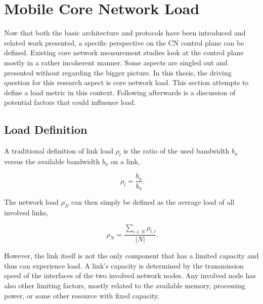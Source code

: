 \section{Mobile Core Network Load}
\label{c4:sec:loaddefinition}

Now that both the basic architecture and protocols have been introduced and related work presented, a specific perspective on the \gls{CN} control plane can be defined. Existing core network measurement studies look at the control plane mostly in a rather incoherent manner. Some aspects are singled out and presented without regarding the bigger picture. In this thesis, the driving question for this research aspect is core network load. This section attempts to define a load metric 
in this context. Following afterwards is a discussion of potential factors that could influence load.


\subsection{Load Definition}

A traditional 
definition of link load $\rho_{l}$ 
is the ratio of the used bandwidth $b_u$ versus the available bandwidth $b_a$ on a link,

\begin{equation}
	\phantom{.}\rho_{l} = \frac{b_{u}}{b_{a}}\text{.}
\end{equation}

The network load $\rho_{N}$ can then simply be defined as the average load of all involved links,

\begin{equation}
	\phantom{.}\rho_{N} = \frac{\sum_{i \in N} \rho_{l,i}}{|N|}\text{.}
\end{equation}


However, the link itself is not the only component that has a limited capacity and thus can experience load. A link's capacity is determined by the transmission speed of the interfaces of the two involved network nodes. 
Any involved node has also other limiting factors, mostly related to the available memory, processing power, or some other resource with fixed capacity.

